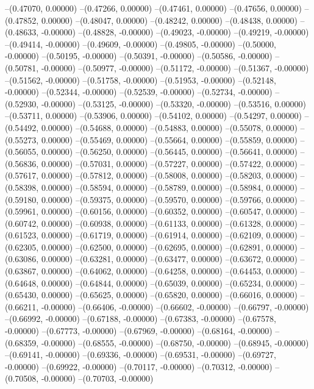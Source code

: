 --(0.47070, 0.00000)
--(0.47266, 0.00000)
--(0.47461, 0.00000)
--(0.47656, 0.00000)
--(0.47852, 0.00000)
--(0.48047, 0.00000)
--(0.48242, 0.00000)
--(0.48438, 0.00000)
--(0.48633, -0.00000)
--(0.48828, -0.00000)
--(0.49023, -0.00000)
--(0.49219, -0.00000)
--(0.49414, -0.00000)
--(0.49609, -0.00000)
--(0.49805, -0.00000)
--(0.50000, -0.00000)
--(0.50195, -0.00000)
--(0.50391, -0.00000)
--(0.50586, -0.00000)
--(0.50781, -0.00000)
--(0.50977, -0.00000)
--(0.51172, -0.00000)
--(0.51367, -0.00000)
--(0.51562, -0.00000)
--(0.51758, -0.00000)
--(0.51953, -0.00000)
--(0.52148, -0.00000)
--(0.52344, -0.00000)
--(0.52539, -0.00000)
--(0.52734, -0.00000)
--(0.52930, -0.00000)
--(0.53125, -0.00000)
--(0.53320, -0.00000)
--(0.53516, 0.00000)
--(0.53711, 0.00000)
--(0.53906, 0.00000)
--(0.54102, 0.00000)
--(0.54297, 0.00000)
--(0.54492, 0.00000)
--(0.54688, 0.00000)
--(0.54883, 0.00000)
--(0.55078, 0.00000)
--(0.55273, 0.00000)
--(0.55469, 0.00000)
--(0.55664, 0.00000)
--(0.55859, 0.00000)
--(0.56055, 0.00000)
--(0.56250, 0.00000)
--(0.56445, 0.00000)
--(0.56641, 0.00000)
--(0.56836, 0.00000)
--(0.57031, 0.00000)
--(0.57227, 0.00000)
--(0.57422, 0.00000)
--(0.57617, 0.00000)
--(0.57812, 0.00000)
--(0.58008, 0.00000)
--(0.58203, 0.00000)
--(0.58398, 0.00000)
--(0.58594, 0.00000)
--(0.58789, 0.00000)
--(0.58984, 0.00000)
--(0.59180, 0.00000)
--(0.59375, 0.00000)
--(0.59570, 0.00000)
--(0.59766, 0.00000)
--(0.59961, 0.00000)
--(0.60156, 0.00000)
--(0.60352, 0.00000)
--(0.60547, 0.00000)
--(0.60742, 0.00000)
--(0.60938, 0.00000)
--(0.61133, 0.00000)
--(0.61328, 0.00000)
--(0.61523, 0.00000)
--(0.61719, 0.00000)
--(0.61914, 0.00000)
--(0.62109, 0.00000)
--(0.62305, 0.00000)
--(0.62500, 0.00000)
--(0.62695, 0.00000)
--(0.62891, 0.00000)
--(0.63086, 0.00000)
--(0.63281, 0.00000)
--(0.63477, 0.00000)
--(0.63672, 0.00000)
--(0.63867, 0.00000)
--(0.64062, 0.00000)
--(0.64258, 0.00000)
--(0.64453, 0.00000)
--(0.64648, 0.00000)
--(0.64844, 0.00000)
--(0.65039, 0.00000)
--(0.65234, 0.00000)
--(0.65430, 0.00000)
--(0.65625, 0.00000)
--(0.65820, 0.00000)
--(0.66016, 0.00000)
--(0.66211, -0.00000)
--(0.66406, -0.00000)
--(0.66602, -0.00000)
--(0.66797, -0.00000)
--(0.66992, -0.00000)
--(0.67188, -0.00000)
--(0.67383, -0.00000)
--(0.67578, -0.00000)
--(0.67773, -0.00000)
--(0.67969, -0.00000)
--(0.68164, -0.00000)
--(0.68359, -0.00000)
--(0.68555, -0.00000)
--(0.68750, -0.00000)
--(0.68945, -0.00000)
--(0.69141, -0.00000)
--(0.69336, -0.00000)
--(0.69531, -0.00000)
--(0.69727, -0.00000)
--(0.69922, -0.00000)
--(0.70117, -0.00000)
--(0.70312, -0.00000)
--(0.70508, -0.00000)
--(0.70703, -0.00000)
